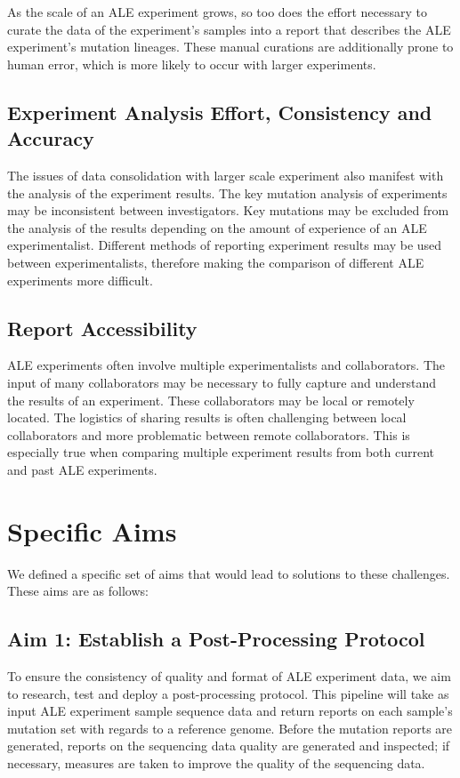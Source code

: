 \documentclass[12pt,final,masters,chapterheads]{ucsd}  %
\begin{document}
As the scale of an ALE experiment grows, so too does the effort necessary to curate the data of the experiment's samples into a report that describes the ALE experiment's mutation lineages. These manual curations are additionally prone to human error, which is more likely to occur with larger experiments.

\subsection{Experiment Analysis Effort, Consistency and Accuracy}

The issues of data consolidation with larger scale experiment also manifest with the analysis of the experiment results. The key mutation analysis of experiments may be inconsistent between investigators. Key mutations may be excluded from the analysis of the results depending on the amount of experience of an ALE experimentalist. Different methods of reporting experiment results may be used between experimentalists, therefore making the comparison of different ALE experiments more difficult.

\subsection{Report Accessibility}

ALE experiments often involve multiple experimentalists and collaborators. The input of many collaborators may be necessary to fully capture and understand the results of an experiment. These collaborators may be local or remotely located. The logistics of sharing results is often challenging between local collaborators and more problematic between remote collaborators. This is especially true when comparing multiple experiment results from both current and past ALE experiments.


\section{Specific Aims}

We defined a specific set of aims that would lead to solutions to these challenges. These aims are as follows:
\subsection{Aim 1: Establish a Post-Processing Protocol}
To ensure the consistency of quality and format of ALE experiment data, we aim to research, test and deploy a post-processing protocol. This pipeline will take as input ALE experiment sample sequence data and return reports on each sample's mutation set with regards to a reference genome. Before the mutation reports are generated, reports on the sequencing data quality are generated and inspected; if necessary, measures are taken to improve the quality of the sequencing data.
\end{document}
